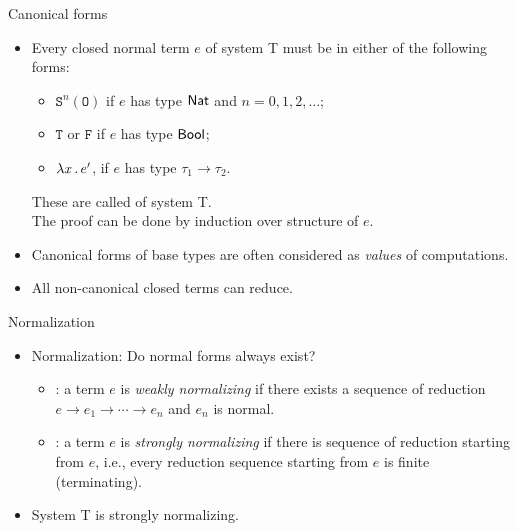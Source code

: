 \documentclass[paper=screen,mode=present,style=zysimple]{powerdot}
\begin{document}
\begin{slide}{Canonical forms}
\begin{itemize}
\item Every closed normal term $e$ of system T must be in either of the following forms:
\begin{itemize}
\item $\mathtt{S}^n (\mathtt O)$ if $e$ has type $\mathsf{Nat}$ and $n = 0, 1, 2, \ldots$;
\item $\mathtt{T}$ or $\mathtt F$ if $e$ has type $\mathsf{Bool}$;
\item $\lambda x \, . \, e'$, if $e$ has type $\tau_1 \to \tau_2$.
\end{itemize}
These are called  of system T. \\
The proof can be done by induction over structure of $e$.
\item Canonical forms of base types are often considered as {\em values} of computations.
\item All non-canonical closed terms can reduce.
\end{itemize}
\end{slide}


\begin{slide}{Normalization}
\begin{itemize}
\item Normalization: Do normal forms always exist?
\begin{itemize}
\item {}: a term $e$ is {\em weakly normalizing} if there exists 
  a  sequence of reduction $e \to e_1 \to \cdots \to e_n$ and $e_n$ is normal. 
\\[0.2em]
\item {}: a term $e$ is {\em strongly normalizing} if there is 
   sequence of reduction starting from $e$, i.e., 
  every reduction sequence starting from $e$ is finite (terminating).
\end{itemize}
\item System T is strongly normalizing. 
\end{itemize}
\end{slide}
\end{document}
